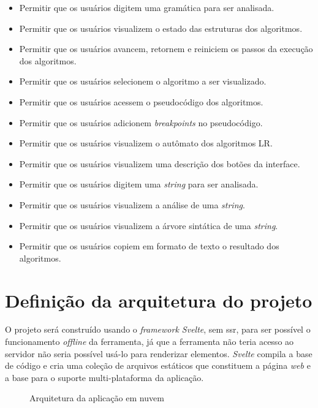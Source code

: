 \begin{itemize}[label={$\sbullet$}]
  \item Permitir que os usuários digitem uma gramática para ser analisada.
  \item Permitir que os usuários visualizem o estado das estruturas dos algoritmos.
  \item Permitir que os usuários avancem, retornem e reiniciem os passos da execução dos algoritmos.
  \item Permitir que os usuários selecionem o algoritmo a ser visualizado.
  \item Permitir que os usuários acessem o pseudocódigo dos algoritmos.
  \item Permitir que os usuários adicionem \textit{breakpoints} no pseudocódigo.
  \item Permitir que os usuários visualizem o autômato dos algoritmos LR.
  \item Permitir que os usuários visualizem uma descrição dos botões da interface.
  \item Permitir que os usuários digitem uma \textit{string} para ser analisada.
  \item Permitir que os usuários visualizem a análise de uma \textit{string}.
  \item Permitir que os usuários visualizem a árvore sintática de uma \textit{string}.
  \item Permitir que os usuários copiem em formato de texto o resultado dos algoritmos.
\end{itemize}

\section{Definição da arquitetura do projeto}
O projeto será construído usando o \textit{framework Svelte}, sem \gls{ssr}, para ser possível o funcionamento \textit{offline} da ferramenta, já que a ferramenta não teria acesso ao servidor não seria possível usá-lo para renderizar elementos. \textit{Svelte} compila a base de código e cria uma coleção de arquivos estáticos que constituem a página \textit{web} e a base para o suporte multi-plataforma da aplicação.
\begin{figure}[ht]
  \centering
  \captionsetup{width=16cm}
  \caption{Arquitetura da aplicação em nuvem}
  \label{fig:arqremo}
\end{figure}

